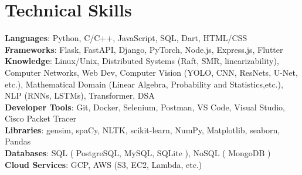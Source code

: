 \documentclass[letterpaper,11pt]{article}
\begin{document}
\section{Technical Skills}
 \begin{itemize}[leftmargin=0.15in, label={}]
    \small{\item{
     \textbf{Languages}{: Python, C/C++, JavaScript, SQL,  Dart, HTML/CSS } \\
     \textbf{Frameworks}{:  Flask, FastAPI, Django,  PyTorch, Node.js, Express.js, Flutter} \\  
     \textbf{Knowledge}{: Linux/Unix, Distributed Systems (Raft, SMR, linearizability), Computer Networks, Web Dev, Computer Vision (YOLO, CNN, ResNets, U-Net, etc.), Mathematical Domain (Linear Algebra, Probability and Statistics,etc.), NLP (RNNs, LSTMs), Transformer, DSA} \\
     \textbf{Developer Tools}{: Git, Docker, Selenium, Postman, VS Code, Visual Studio, Cisco Packet Tracer } \\
     \textbf{Libraries}{: gensim, spaCy, NLTK, scikit-learn, NumPy, Matplotlib,  seaborn, Pandas} \\
     \textbf{Databases}{: SQL ( PostgreSQL, MySQL, SQLite ), NoSQL ( MongoDB ) } \\
     \textbf{Cloud Services}{: GCP, AWS (S3, EC2, Lambda, etc.)} \\
    }}
 \end{itemize}



\end{document}
